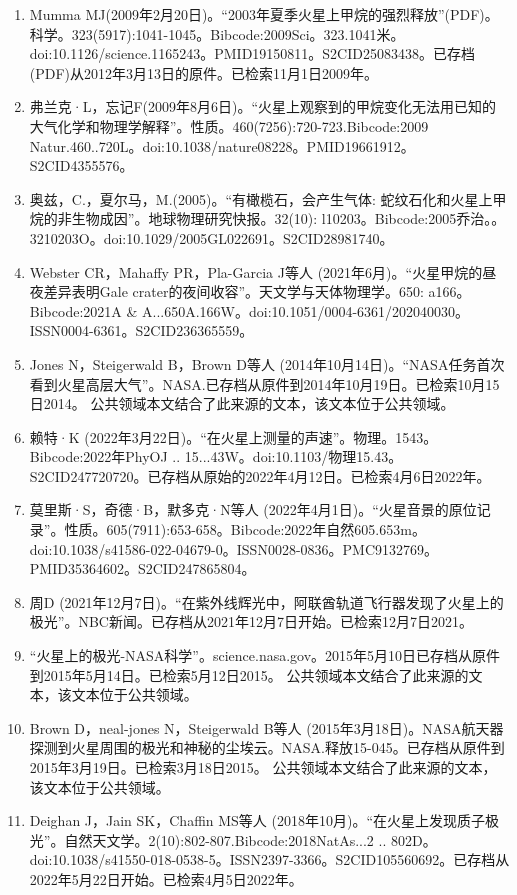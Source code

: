 \begin{enumerate}
\item Mumma MJ(2009年2月20日)。“2003年夏季火星上甲烷的强烈释放”(PDF)。科学。323(5917):1041-1045。Bibcode:2009Sci。323.1041米。doi:10.1126/science.1165243。PMID19150811。S2CID25083438。已存档(PDF)从2012年3月13日的原件。已检索11月1日2009年。   
\item 弗兰克·L，忘记F(2009年8月6日)。“火星上观察到的甲烷变化无法用已知的大气化学和物理学解释”。性质。460(7256):720-723.Bibcode:2009 Natur.460..720L。doi:10.1038/nature08228。PMID19661912。S2CID4355576。  
\item 奥兹，C.，夏尔马，M.(2005)。“有橄榄石，会产生气体: 蛇纹石化和火星上甲烷的非生物成因”。地球物理研究快报。32(10): l10203。Bibcode:2005乔治。。3210203O。doi:10.1029/2005GL022691。S2CID28981740。 
\item Webster CR，Mahaffy PR，Pla-Garcia J等人 (2021年6月)。“火星甲烷的昼夜差异表明Gale crater的夜间收容”。天文学与天体物理学。650: a166。Bibcode:2021A & A...650A.166W。doi:10.1051/0004-6361/202040030。ISSN0004-6361。S2CID236365559。  
\item Jones N，Steigerwald B，Brown D等人 (2014年10月14日)。“NASA任务首次看到火星高层大气”。NASA.已存档从原件到2014年10月19日。已检索10月15日2014。 公共领域本文结合了此来源的文本，该文本位于公共领域。
\item 赖特·K (2022年3月22日)。“在火星上测量的声速”。物理。1543。Bibcode:2022年PhyOJ .. 15...43W。doi:10.1103/物理15.43。S2CID247720720。已存档从原始的2022年4月12日。已检索4月6日2022年。 
\item 莫里斯·S，奇德·B，默多克·N等人 (2022年4月1日)。“火星音景的原位记录”。性质。605(7911):653-658。Bibcode:2022年自然605.653m。doi:10.1038/s41586-022-04679-0。ISSN0028-0836。PMC9132769。PMID35364602。S2CID247865804。    
\item 周D (2021年12月7日)。“在紫外线辉光中，阿联酋轨道飞行器发现了火星上的极光”。NBC新闻。已存档从2021年12月7日开始。已检索12月7日2021。
\item “火星上的极光-NASA科学”。science.nasa.gov。2015年5月10日已存档从原件到2015年5月14日。已检索5月12日2015。 公共领域本文结合了此来源的文本，该文本位于公共领域。
\item Brown D，neal-jones N，Steigerwald B等人 (2015年3月18日)。NASA航天器探测到火星周围的极光和神秘的尘埃云。NASA.释放15-045。已存档从原件到2015年3月19日。已检索3月18日2015。 公共领域本文结合了此来源的文本，该文本位于公共领域。
\item Deighan J，Jain SK，Chaffin MS等人 (2018年10月)。“在火星上发现质子极光”。自然天文学。2(10):802-807.Bibcode:2018NatAs...2 .. 802D。doi:10.1038/s41550-018-0538-5。ISSN2397-3366。S2CID105560692。已存档从2022年5月22日开始。已检索4月5日2022年。  

\end{enumerate}
